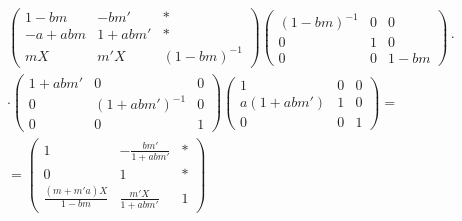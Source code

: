 \documentclass[oneside, 8pt]{amsart}
\theoremstyle{remark}
\theoremstyle{definition}
\numberwithin{equation}{section}
\begin{document}
\begin{multline}
 \left(\begin{array}{ccc} 
 1 - bm & - bm' & * \\
 - a + abm & 1 + abm' & * \\
 mX & m'X & (1 - bm)^{-1} 
 \end{array}\right)
 \left(\begin{array}{ccc} 
 (1  - bm)^{-1} & 0 & 0 \\
 0 & 1 & 0 \\
 0 & 0 & 1 - bm 
 \end{array}\right) \cdot \\ \cdot
\left(\begin{array}{ccc} 
 1 + abm' & 0 & 0 \\
 0 & (1 + abm')^{-1} & 0 \\
 0 & 0 & 1 
 \end{array}\right)
 \left(\begin{array}{ccc} 
 1 & 0 & 0 \\
 a(1 + abm') & 1 & 0 \\
 0 & 0 & 1 
 \end{array}\right) = \\
 = 
 \left(\begin{array}{ccc} 
 1 & - \frac{bm'}{1 + abm'} & * \\
 0 & 1 & * \\
 \frac{(m + m'a)X}{1 - bm} & \frac{m'X}{1 + abm'} & 1 
 \end{array}\right)
\end{multline}
\end{document}
